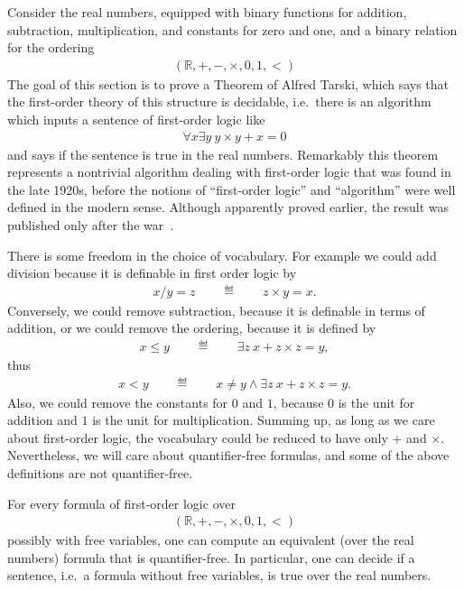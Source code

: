 \label{sec:tarski}
\newcommand{\bss}{\textsc{bss}\xspace}
\newcommand{\Real}{\mathbb R}
Consider the real numbers, equipped with binary functions for addition, subtraction, multiplication, and constants for zero and one, and a binary relation for the ordering
\begin{align*}
  (\Real, +, -, \times, 0, 1, <)
\end{align*}
The goal of this section is to prove a Theorem of Alfred Tarski, which says that the first-order theory of this structure is decidable, i.e.~there is an algorithm which inputs a sentence of first-order logic like
\begin{align*}
\forall x  \exists y \ y \times y + x = 0
\end{align*}
and says if the sentence is true in the real numbers. Remarkably this theorem represents a nontrivial algorithm dealing with first-order logic that was found in the late 1920s, before the notions of ``first-order logic'' and ``algorithm'' were well defined in the modern sense. Although apparently proved earlier, the result was published only after the war~\cite{Tarski:1951vl}.

There is some freedom in the choice of vocabulary. For example we could add division because it is definable in first order logic by
\begin{align*}
  x / y = z \qquad \eqdef \qquad z \times y = x.
\end{align*}
Conversely, we could remove subtraction, because it is definable in terms of addition, or we could remove the ordering, because it is defined by
\begin{align*}
  x \leq y \qquad \eqdef \qquad \exists z \ x + z \times z = y,
\end{align*}
thus
\begin{align*}
  x < y \qquad \eqdef \qquad x \ne y \land \exists z \ x + z \times z = y.
\end{align*}
Also, we could remove the constants for $0$ and $1$, because $0$ is the unit for addition and $1$ is the unit for multiplication. Summing up, as long as we care about first-order logic, the vocabulary could be reduced to have only $+$ and $\times$. Nevertheless, we will care about quantifier-free formulas, and some of the above definitions are not quantifier-free.

\begin{theorem}\label{thm:tarski}
	For every formula of first-order logic over 
	\begin{align*}
  (\Real, +, -, \times, 0, 1, <)
\end{align*}
possibly with free variables, one can compute an equivalent (over the real numbers) formula that is quantifier-free. In particular, one can decide if a sentence, i.e.~a formula without free variables, is true over the real numbers.
\end{theorem}









